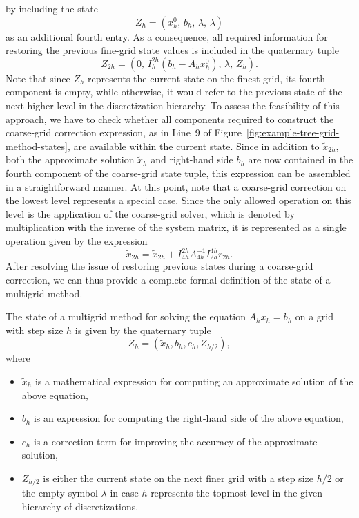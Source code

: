 by including the state 
\begin{equation*}
Z_h = (x_{h}^0, \, b_h, \, \lambda, \, \lambda) 
\end{equation*} 
as an additional fourth entry. 
As a consequence, all required information for restoring the previous fine-grid state values is included in the quaternary tuple 
\begin{equation*}
	Z_{2h} = (0, \, I_{h}^{2h}(b_{h} - A_h x_{h}^0), \, \lambda, \, Z_h).
\end{equation*}
Note that since $Z_h$ represents the current state on the finest grid, its fourth component is empty, while otherwise, it would refer to the previous state of the next higher level in the discretization hierarchy.
To assess the feasibility of this approach, we have to check whether all components required to construct the coarse-grid correction expression, as in Line~9 of Figure~\ref{fig:example-tree-grid-method-states}, are available within the current state.
Since in addition to $\tilde{x}_{2h}$, both the approximate solution $\tilde{x}_h$ and right-hand side $b_h$ are now contained in the fourth component of the coarse-grid state tuple, this expression can be assembled in a straightforward manner.
At this point, note that a coarse-grid correction on the lowest level represents a special case. 
Since the only allowed operation on this level is the application of the coarse-grid solver, which is denoted by multiplication with the inverse of the system matrix, it is represented as a single operation given by the expression 
\begin{equation*}
	\tilde{x}_{2h} = \tilde{x}_{2h} + I_{4h}^{2h} A_{4h}^{-1} I_{2h}^{4h} r_{2h}.
\end{equation*}
After resolving the issue of restoring previous states during a coarse-grid correction, we can thus provide a complete formal definition of the state of a multigrid method.
\begin{definition}
\label{def:multigrid-state}
The state of a multigrid method for solving the equation $A_{h} x_{h} = b_{h}$ on a grid with step size $h$ is given by the quaternary tuple
\begin{equation}
	Z_{h} = \left( \tilde{x}_{h}, b_{h}, c_{h}, Z_{h/2}\right), 
\end{equation}
where
\begin{itemize}
	\item $\tilde{x}_{h}$ is a mathematical expression for computing an approximate solution of the above equation,
	\item $b_{h}$ is an expression for computing the right-hand side of the above equation,
	\item $c_{h}$ is a correction term for improving the accuracy of the approximate solution,
	\item $Z_{h/2}$ is either the current state on the next finer grid with a step size $h/2$ or the empty symbol $\lambda$ in case $h$ represents the topmost level in the given hierarchy of discretizations.
\end{itemize}
\end{definition}
